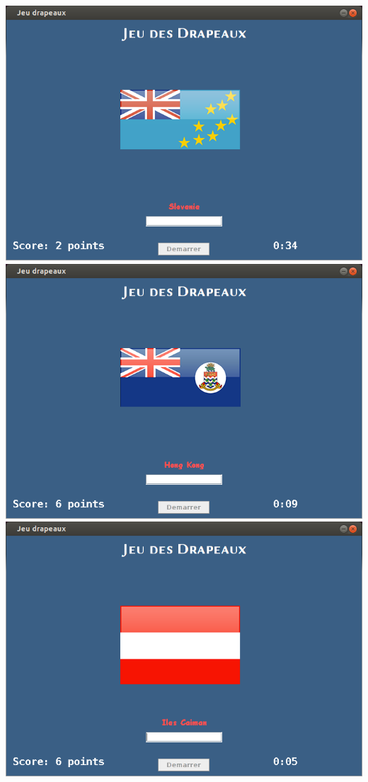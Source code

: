 \documentclass{article}
\begin{document}
\begin{center}
\includegraphics[scale=0.5]{capture3.png}\\
\includegraphics[scale=0.5]{capture4.png}\\
\includegraphics[scale=0.5]{capture5.png}\\

\end{center}
\end{document}
